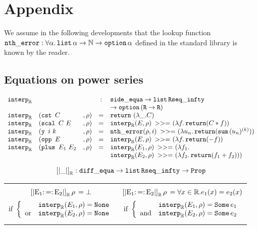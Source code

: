 \newpage{}
\section*{Appendix}

We assume in the following developments that the lookup function
$\ntherr : \forall \alpha. \alist{} \alpha \rightarrow \N \rightarrow \option{}
\alpha$ defined in the standard library is known by the reader.

\subsection*{Equations on power series}

\label{interpR}

$$\begin{array}{lllcl}
\IR & & & : & \se \rightarrow \alist{} \mathtt{Rseq\_infty} \\
    & & &   & \rightarrow \option{} (\texttt{R} \rightarrow \texttt{R}) \\
\IR & (\cst~ C & , \rho) & = & \return~ (\lambda \_.C)\\
\IR & (\scal~ C ~ E &, \rho) & = & \IR(E, \rho) \bind (\lambda f. \return (C * f))\\
\IR & (\y ~ i ~ k &, \rho) & = & \ntherr(\rho, i) \bind (\lambda u_n. \return (\Psum{}(u_n)^{(k)})) \\
\IR & (\opp ~E &, \rho) & = & \IR(E,\rho) \bind (\lambda f. \return (- f))\\
\IR & (\plus ~ E_1 ~ E_2 &, \rho) & = & \IR(E_1,\rho) \bind (\lambda f_1.\\
    & & &   & \IR(E_2,\rho) \bind (\lambda f_2. \return (f_1 + f_2)))\\
\end{array}$$


$$\left[\left| \_ \right|\right]_{\R} : \de \rightarrow \alist{}
\mathtt{Rseq\_infty} \rightarrow \Prop$$

\begin{center}
\begin{tabular}{c|c}
\begin{minipage}{0.45\textwidth}
$$\SemR{} = \bot$$
$$ \text{if } \left\lbrace
\begin{array}{ll}
& \IR(E_1, \rho) = \None\\
\text{or} & \IR(E_2, \rho) = \None
\end{array}\right.$$
\end{minipage}

& \begin{minipage}{0.45\textwidth}
$$\SemR{} = \forall x \in \R. e_1(x) = e_2(x)$$
$$\text{if } \left\lbrace
\begin{array}{ll}
& \IR(E_1, \rho) = \Some e_1\\
\text{and} & \IR(E_2, \rho) = \Some e_2
\end{array}\right.$$
\end{minipage}

\end{tabular}
\end{center}
